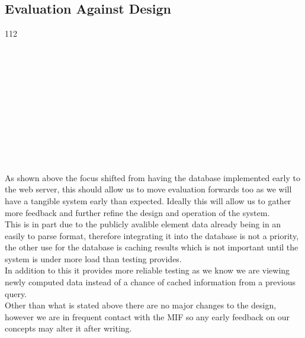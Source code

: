\documentclass[a4paper, 12pt]{article}
\begin{document}
\subsection{Evaluation Against Design}
\begin{center}
	\hspace{-1.5cm}
	\begin{ganttchart}[ 
		hgrid, vgrid, 
		x unit=0.65cm, 
		y unit chart=0.6cm,
		link mid=0.5,
		bar label font=\footnotesize]{1}{12}
		 \\
		
		
		 \\
		 \\
		 \\
		 \\
		
		 \\
		
		 \\
		 \\
		 \\
		
		 \\
		
		 \\
		
	\end{ganttchart}
\end{center}

As shown above the focus shifted from having the database implemented early to the web server, this should allow us to move evaluation forwards too as we will have a tangible system early than expected. Ideally this will allow us to gather more feedback and further refine the design and operation of the system. \\

This is in part due to the publicly avalible element data already being in an easily to parse format, therefore integrating it into the database is not a priority, the other use for the database is caching results which is not important until the system is under more load than testing provides. \\

In addition to this it provides more reliable testing as we know we are viewing newly computed data instead of a chance of cached information from a previous query. \\

Other than what is stated above there are no major changes to the design, however we are in frequent contact with the MIF so any early feedback on our concepts may alter it after writing. 
\end{document}
